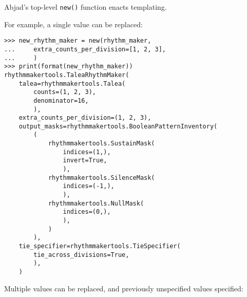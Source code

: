 Abjad's top-level \texttt{new()} function enacts templating.

For example, a single value can be replaced:

\begin{comment}
<abjad>
new_rhythm_maker = new(rhythm_maker,
    extra_counts_per_division=[1, 2, 3],
    )
print(format(new_rhythm_maker))
</abjad>
\end{comment}

\begin{abjadbookoutput}
\begin{singlespacing}
\vspace{-0.5\baselineskip}
\begin{lstlisting}
>>> new_rhythm_maker = new(rhythm_maker,
...     extra_counts_per_division=[1, 2, 3],
...     )
>>> print(format(new_rhythm_maker))
rhythmmakertools.TaleaRhythmMaker(
    talea=rhythmmakertools.Talea(
        counts=(1, 2, 3),
        denominator=16,
        ),
    extra_counts_per_division=(1, 2, 3),
    output_masks=rhythmmakertools.BooleanPatternInventory(
        (
            rhythmmakertools.SustainMask(
                indices=(1,),
                invert=True,
                ),
            rhythmmakertools.SilenceMask(
                indices=(-1,),
                ),
            rhythmmakertools.NullMask(
                indices=(0,),
                ),
            )
        ),
    tie_specifier=rhythmmakertools.TieSpecifier(
        tie_across_divisions=True,
        ),
    )
\end{lstlisting}
\end{singlespacing}
\end{abjadbookoutput}

Multiple values can be replaced, and previously unspecified values specified:

\begin{comment}
<abjad>
new_rhythm_maker = new(new_rhythm_maker,
    talea=rhythmmakertools.Talea([2, 1], 8),
    extra_counts_per_division=[1, 2, 3],
    beam_specifier=rhythmmakertools.BeamSpecifier(
        beam_divisions_together=True,
        ),
    )
print(format(new_rhythm_maker))
</abjad>
\end{comment}

